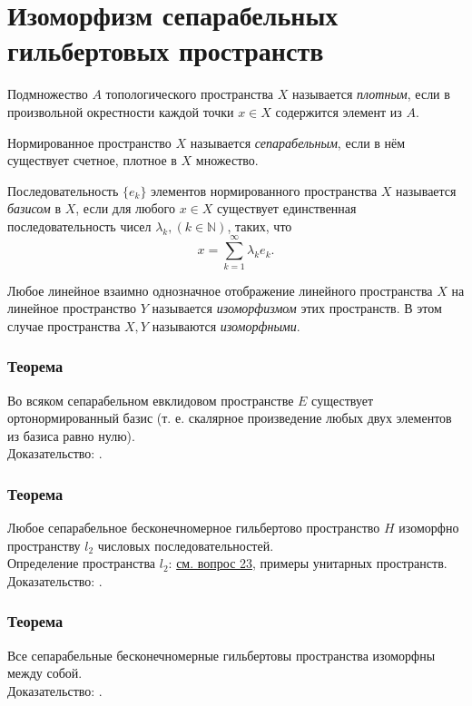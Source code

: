 \section{Изоморфизм сепарабельных гильбертовых пространств}
\label{sec:q-25}
Подмножество $A$ топологического пространства $X$ называется \textit{плотным}, если в произвольной окрестности каждой точки $x \in X$ содержится элемент из $A$.

Нормированное пространство $X$ называется \textit{сепарабельным}, если в нём существует счетное, плотное в $X$ множество.

Последовательность $\{e_k\}$ элементов нормированного пространства $X$ называется \textit{базисом} в $X$, если для любого $x \in X$ существует единственная последовательность чисел $\lambda_k, (k \in \mathbb{N})$, таких, что
$$x = \sum_{k = 1}^{\infty}\lambda_k e_k.$$

Любое линейное взаимно однозначное отображение линейного пространства $X$ на линейное пространство $Y$ называется \textit{изоморфизмом} этих пространств. В этом случае пространства $X, Y$ называются \textit{изоморфными}.

\subsubsection*{Теорема}
Во всяком сепарабельном евклидовом пространстве $E$ существует ортонормированный базис (т. е. скалярное произведение любых двух элементов из базиса равно нулю).\\
Доказательство: \cite[с.~91]{mipt-lectures-1}.

\subsubsection*{Теорема}
Любое сепарабельное бесконечномерное гильбертово пространство $H$ изоморфно пространству $l_2$ числовых последовательностей.\\
Определение пространства $l_2$:  \hyperref[sec:q-23]{см. вопрос 23}, примеры унитарных пространств.\\
Доказательство: \cite[с.~92]{mipt-lectures-1}.

\subsubsection*{Теорема}
Все сепарабельные бесконечномерные гильбертовы пространства изоморфны между собой.\\
Доказательство: \cite[с.~93]{mipt-lectures-1}.